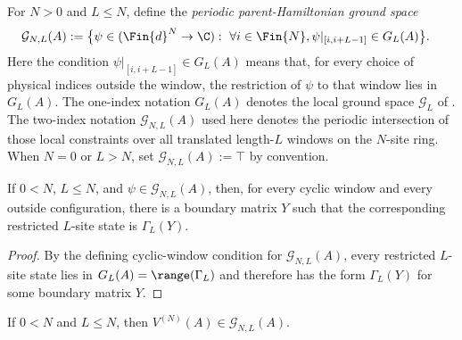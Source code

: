 \begin{definition}\label{def:chain_ground_space}
    \leanok
    For $N>0$ and $L\le N$, define the \emph{periodic parent-Hamiltonian ground
        space}
    \begin{align}
        \mathcal G_{N,L}(A)
        :=\bigl\{\psi\in(\Fin{d}^N\to\C):{}
         & \ \forall i\in\Fin{N},
        \psi|_{[i,i+L-1]}\in G_L(A)\bigr\}. \notag
    \end{align}
    Here the condition $\psi|_{[i,i+L-1]}\in G_L(A)$ means that, for every
    choice of physical indices outside the window, the restriction of $\psi$ to
    that window lies in $G_L(A)$. The one-index notation $G_L(A)$ denotes the
    local ground space $\mathcal G_L$ of
    \cite[Section~IV.C]{Cirac2021Matrix}. The two-index notation
    $\mathcal G_{N,L}(A)$ used here denotes the periodic intersection of those
    local constraints over all translated length-$L$ windows on the $N$-site
    ring. When $N=0$ or $L>N$, set $\mathcal G_{N,L}(A):=\top$ by convention.
\end{definition}

\begin{lemma}
    \label{lem:chain_ground_space_window_witnesses}
    \leanok
    If $0<N$, $L\le N$, and $\psi\in\mathcal G_{N,L}(A)$, then, for every
    cyclic window and every outside configuration, there is a boundary matrix
    $Y$ such that the corresponding restricted $L$-site state is
    $\Gamma_L(Y)$.
\end{lemma}

\begin{proof}
    \leanok
    By the defining cyclic-window condition for $\mathcal G_{N,L}(A)$, every
    restricted $L$-site state lies in $G_L(A)=\range(\Gamma_L)$ and therefore
    has the form $\Gamma_L(Y)$ for some boundary matrix $Y$.
\end{proof}

\begin{lemma}
    \label{lem:mpv_mem_chain_ground_space}
    \leanok
    If $0<N$ and $L\le N$, then
    $V^{(N)}(A)\in\mathcal G_{N,L}(A)$.
\end{lemma}

